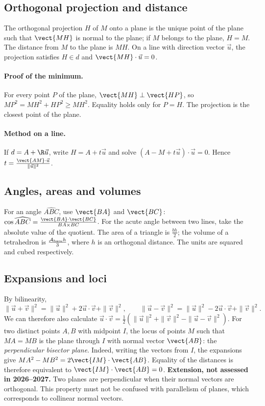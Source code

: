 \subsection{Orthogonal projection and distance}
The orthogonal projection $H$ of $M$ onto a plane is the unique point of the plane such that $\vect{MH}$ is normal to the plane; if $M$ belongs to the plane, $H=M$. The distance from $M$ to the plane is $MH$. On a line with direction vector $\vec u$, the projection satisfies $H\in d$ and $\vect{MH}\cdot\vec u=0$.
\paragraph{Proof of the minimum.} For every point $P$ of the plane, $\vect{MH}\perp\vect{HP}$, so $MP^2=MH^2+HP^2\ge MH^2$. Equality holds only for $P=H$. The projection is the closest point of the plane.
\paragraph{Method on a line.} If $d=A+\R\vec u$, write $H=A+t\vec u$ and solve $(A-M+t\vec u)\cdot\vec u=0$. Hence $t=\frac{\vect{AM}\cdot\vec{u}}{\lVert\vec u\rVert^2}$.
\subsection{Angles, areas and volumes}
For an angle $\widehat{ABC}$, use $\vect{BA}$ and $\vect{BC}$: $\cos \widehat{ABC}=\frac{\vect{BA}\cdot\vect{BC}}{BA\times BC}$. For the acute angle between two lines, take the absolute value of the quotient.
The area of a triangle is $\frac{bh}{2}$; the volume of a tetrahedron is $\frac{\mathcal{A}_{\rm base}h}{3}$, where $h$ is an orthogonal distance. The units are squared and cubed respectively.
\subsection{Expansions and loci}
By bilinearity,
\[\|\vec u+\vec v\|^2=\|\vec u\|^2+2\vec u\cdot\vec v+\|\vec v\|^2,\qquad
\|\vec u-\vec v\|^2=\|\vec u\|^2-2\vec u\cdot\vec v+\|\vec v\|^2.\]
We can therefore also calculate $\vec u\cdot\vec v=\frac12(\|\vec u\|^2+\|\vec v\|^2-\|\vec u-\vec v\|^2)$.
For two distinct points $A,B$ with midpoint $I$, the locus of points $M$ such that $MA=MB$ is the plane through $I$ with normal vector $\vect{AB}$: the \emph{perpendicular bisector plane}. Indeed, writing the vectors from $I$, the expansions give $MA^2-MB^2=2\vect{IM}\cdot\vect{AB}$. Equality of the distances is therefore equivalent to $\vect{IM}\cdot\vect{AB}=0$.
\textbf{Extension, not assessed in 2026--2027.} Two planes are perpendicular when their normal vectors are orthogonal. This property must not be confused with parallelism of planes, which corresponds to collinear normal vectors.


